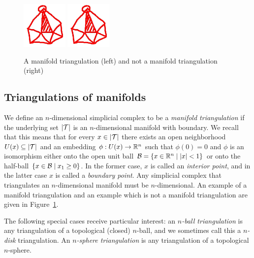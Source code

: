 \documentclass[10pt,letterpaper]{article}
\newcommand{\mwl}[1]{{\color{red}#1}}
\begin{document}
\begin{figure}[h]
\centerline{\includegraphics[width=0.2\textwidth]{revision/homotopic_ball.jpg} \quad \includegraphics[width=0.2\textwidth]{revision/homotopic_ball.jpg}}
\caption{A manifold triangulation (left) and not a manifold triangulation (right)}
\label{figure:not_manifold_triang}
\end{figure}


\subsection{Triangulations of manifolds}

We define an $n$-dimensional simplicial complex to be a \emph{manifold triangulation} if the underlying set $\left| {\mathcal T} \right|$ is an $n$-dimensional manifold with boundary.
We recall that this means that for every $x \in \left| {\mathcal T} \right|$
there exists an open neighborhood $U(x) \subseteq \left| {\mathcal T} \right|$ and an embedding $\phi : U(x) \rightarrow {\mathbb R}^{n}$
such that $\phi(0) = 0$ and $\phi$ is an isomorphism either onto the open unit ball $\calB = \{ x \in \bbR^{n} \suchthat |x| < 1 \}$
or onto the half-ball $\{ x \in \calB \suchthat x_1 \geq 0 \}$.
In the former case, $x$ is called an \emph{interior point}, and in the latter case $x$ is called a \emph{boundary point}. 
Any simplicial complex that triangulates an $n$-dimensional manifold must be $n$-dimensional. 
An example of a manifold triangulation and an example which is not a manifold triangulation are given in Figure~\ref{figure:not_manifold_triang}.

The following special cases receive particular interest:
an \textit{$n$-ball triangulation} is any triangulation of a topological (closed) $n$-ball\mwl{, and we sometimes call this a \textit{$n$-disk} triangulation}.
An \textit{$n$-sphere triangulation} is any triangulation of a topological $n$-sphere. 
\end{document}
